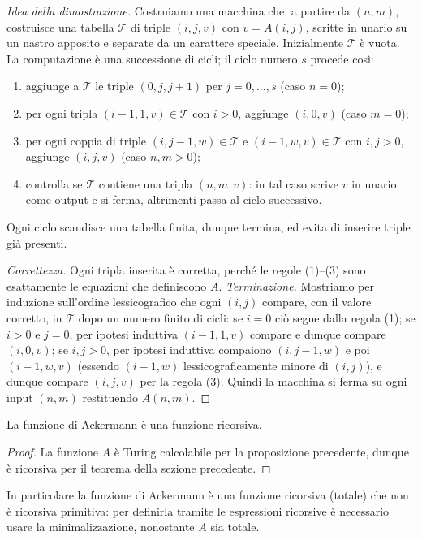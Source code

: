 \begin{proof}[Idea della dimostrazione]
Costruiamo una macchina che, a partire da $(n,m)$, costruisce una tabella $\mathcal T$ di triple $(i,j,v)$ con $v=A(i,j)$, scritte in unario su un nastro apposito e separate da un carattere speciale. Inizialmente $\mathcal T$ è vuota. La computazione è una successione di cicli; il ciclo numero $s$ procede così:
\begin{enumerate}
\item aggiunge a $\mathcal T$ le triple $(0,j,j+1)$ per $j=0,\dots,s$ (caso $n=0$);
\item per ogni tripla $(i-1,1,v)\in\mathcal T$ con $i>0$, aggiunge $(i,0,v)$ (caso $m=0$);
\item per ogni coppia di triple $(i,j-1,w)\in\mathcal T$ e $(i-1,w,v)\in\mathcal T$ con $i,j>0$, aggiunge $(i,j,v)$ (caso $n,m>0$);
\item controlla se $\mathcal T$ contiene una tripla $(n,m,v)$: in tal caso scrive $v$ in unario come output e si ferma, altrimenti passa al ciclo successivo.
\end{enumerate}
Ogni ciclo scandisce una tabella finita, dunque termina, ed evita di inserire triple già presenti.

\emph{Correttezza.} Ogni tripla inserita è corretta, perché le regole (1)--(3) sono esattamente le equazioni che definiscono $A$. \emph{Terminazione.} Mostriamo per induzione sull'ordine lessicografico che ogni $(i,j)$ compare, con il valore corretto, in $\mathcal T$ dopo un numero finito di cicli: se $i=0$ ciò segue dalla regola (1); se $i>0$ e $j=0$, per ipotesi induttiva $(i-1,1,v)$ compare e dunque compare $(i,0,v)$; se $i,j>0$, per ipotesi induttiva compaiono $(i,j-1,w)$ e poi $(i-1,w,v)$ (essendo $(i-1,w)$ lessicograficamente minore di $(i,j)$), e dunque compare $(i,j,v)$ per la regola (3). Quindi la macchina si ferma su ogni input $(n,m)$ restituendo $A(n,m)$.
\end{proof}

\begin{prop}
La funzione di Ackermann è una funzione ricorsiva.
\end{prop}

\begin{proof}
La funzione $A$ è Turing calcolabile per la proposizione precedente, dunque è ricorsiva per il teorema della sezione precedente.
\end{proof}

\begin{rema}
In particolare la funzione di Ackermann è una funzione ricorsiva (totale) che non è ricorsiva primitiva: per definirla tramite le espressioni ricorsive è necessario usare la minimalizzazione, nonostante $A$ sia totale.
\end{rema}

